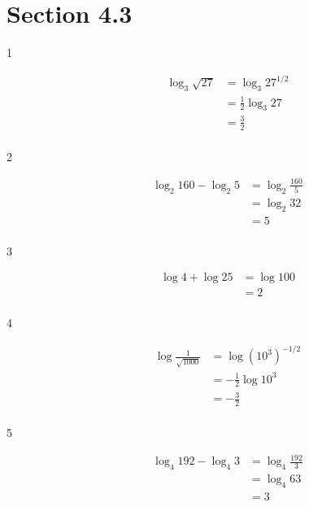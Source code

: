 \documentclass{exam}
\begin{document}
  \ifprintanswers
    \section{Section 4.3}

    \begin{description}

      \item[1] 
        \begin{align*}
          \log_3 \sqrt{27} &= \log_3 27^{1/2} \\
                           &= \frac{1}{2} \log_3 27 \\
                           &= \boxed{\frac{3}{2}} \\
        \end{align*}

      \item[2] 
        \begin{align*}
          \log_2 160 - \log_2 5 &= \log_2 \frac{160}{5} \\
                                &= \log_2 32 \\
                                &= \boxed{5} \\
        \end{align*}

      \item[3] 
        \begin{align*}
          \log 4 + \log 25 &= \log 100 \\
                           &= \boxed{2} \\
        \end{align*}

      \item[4] 
        \begin{align*}
          \log \frac{1}{\sqrt{1000}} &= \log \left( 10^3 \right)^{-1/2} \\
                                     &= - \frac{1}{2} \log 10^3 \\
                                     &= \boxed{-\frac{3}{2}} \\
        \end{align*}

      \item[5] 
        \begin{align*}
          \log_4 192 - \log_4 3 &= \log_4 \frac{192}{3} \\
                                &= \log_4 63 \\
                                &= \boxed{3} \\
        \end{align*}


\end{description}
\end{document}
